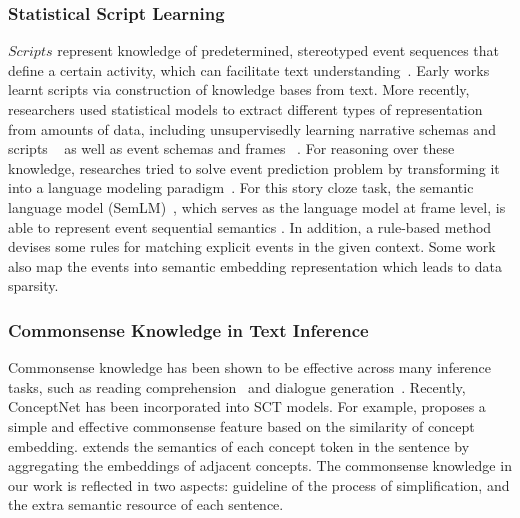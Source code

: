 \subsubsection*{Statistical Script Learning}
$Scripts$ represent knowledge of predetermined, stereotyped event sequences that define a certain activity, 
which can facilitate text understanding~\cite{chambers2009unsupervised, regneri2011learning, schank1975scripts}.
Early works~\cite{schank2013scripts,mooney1985learning} learnt scripts 
via construction of knowledge bases from text. 
More recently, researchers used statistical models to extract different types 
of representation from amounts of data, including unsupervisedly learning 
narrative schemas and scripts
~\cite{chambers2009unsupervised,regneri2011learning} as well as event schemas and frames 
~\cite{chambers2011template,balasubramanian2013generating,sha2016joint,huang2016liberal}.
For reasoning over these knowledge, researches tried to solve event
 prediction problem by transforming it into a language modeling paradigm~\cite{pichotta2014statistical,rudinger2015script,hu2017happens}.
For this story cloze task, the semantic language model (SemLM)~\cite{peng2016two},
which serves as the language model at frame level,
is able to represent event sequential semantics
\cite{li2018multi,chaturvedi2017story}. In addition, a rule-based 
method~\cite{lin2017reasoning} devises some rules for matching 
explicit events in the given context. Some work\cite{modi2014inducing,regneri-etal-2010-learning,modi2016event} also
map the events into semantic embedding representation which leads to 
data sparsity.

\subsubsection*{Commonsense Knowledge in Text Inference}
Commonsense knowledge has been shown to be effective across many
inference tasks,
such as reading comprehension~\cite{mihaylov2018knowledgeable}
and dialogue generation~\cite{liu2018knowledge}.
Recently, ConceptNet has been incorporated into SCT models.
For example, \cite{chen2018incorporating} proposes a simple and
effective commonsense feature based on the similarity of concept embedding.
\cite{guan2018story} extends the semantics of each concept token
in the sentence by aggregating the embeddings of adjacent concepts.
The commonsense knowledge in our work is reflected in two aspects:
guideline of the process of simplification,
and the extra semantic resource of each sentence.

